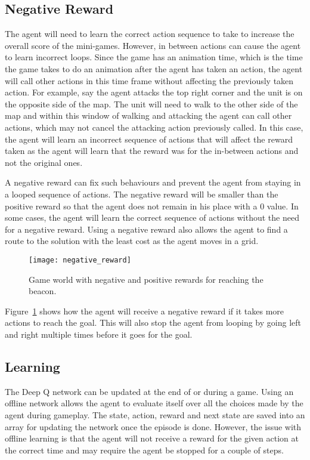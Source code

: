\subsection{Negative Reward}

The agent will need to learn the correct action sequence to take to increase the
overall score of the mini-games. However, in between actions can cause the agent
to learn incorrect loops. Since the game has an animation time, which is the
time the game takes to do an animation after the agent has taken an action, the
agent will call other actions in this time frame without affecting the
previously taken action. For example, say the agent attacks the top right corner
and the unit is on the opposite side of the map. The unit will need to walk to
the other side of the map and within this window of walking and attacking the
agent can call other actions, which may not cancel the attacking action
previously called. In this case, the agent will learn an incorrect sequence of
actions that will affect the reward taken as the agent will learn that the
reward was for the in-between actions and not the original ones.

A negative reward can fix such behaviours and prevent the agent from staying in a
looped sequence of actions. The negative reward will be smaller than the
positive reward so that the agent does not remain in his place with a 0 value.
In some cases, the agent will learn the correct sequence of actions without the
need for a negative reward. Using a negative reward also allows the agent to
find a route to the solution with the least cost as the agent moves in a grid.

\begin{figure}[h]
    \centering
    \texttt{[image: negative\_reward]}
    \caption{Game world with negative and positive rewards for reaching the beacon.}%
    \label{fig:negative_reward}
\end{figure}

Figure~\ref{fig:negative_reward} shows how the agent will receive a negative
reward if it takes more actions to reach the goal. This will also stop the agent
from looping by going left and right multiple times before it goes for the goal.

\subsection{Learning}

The Deep Q network can be updated at the end of or during a game. Using an
offline network allows the agent to evaluate itself over all the choices made by
the agent during gameplay. The state, action, reward and next state are saved
into an array for updating the network once the episode is done. However, the
issue with offline learning is that the agent will not receive a reward for the
given action at the correct time and may require the agent be stopped for a
couple of steps.

